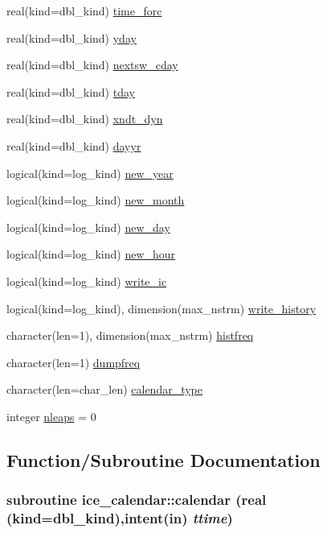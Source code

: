 \begin{DoxyCompactItemize}
real(kind=dbl\_\-kind) \hyperlink{namespaceice__calendar_abc4a1fb6d6f8356506f078c4265a6ce6}{time\_\-forc}
\item 
real(kind=dbl\_\-kind) \hyperlink{namespaceice__calendar_a4b4393c99a1d82bc45fcee5d7f6c1eab}{yday}
\item 
real(kind=dbl\_\-kind) \hyperlink{namespaceice__calendar_a04f5a8dadd1f3a10e3909afc246aebe4}{nextsw\_\-cday}
\item 
real(kind=dbl\_\-kind) \hyperlink{namespaceice__calendar_a7a56bc05233c72a7b5176c7c2d6abe7c}{tday}
\item 
real(kind=dbl\_\-kind) \hyperlink{namespaceice__calendar_aaf7ba66b2706feaef77263c10d65e28a}{xndt\_\-dyn}
\item 
real(kind=dbl\_\-kind) \hyperlink{namespaceice__calendar_a729d7e640fbfecac3733865efcfcb042}{dayyr}
\item 
logical(kind=log\_\-kind) \hyperlink{namespaceice__calendar_a2d0b7e0b5144d49dd2e39690c5cde21f}{new\_\-year}
\item 
logical(kind=log\_\-kind) \hyperlink{namespaceice__calendar_adf4af22505e09a7ed33b5c480cce75af}{new\_\-month}
\item 
logical(kind=log\_\-kind) \hyperlink{namespaceice__calendar_a766cb3e9a2b5b634a04a558bade2457c}{new\_\-day}
\item 
logical(kind=log\_\-kind) \hyperlink{namespaceice__calendar_a0c8bfc71143cc3c7aef340ad41a9068d}{new\_\-hour}
\item 
logical(kind=log\_\-kind) \hyperlink{namespaceice__calendar_a0ab845607bc7966960d11bffb6f9f069}{write\_\-ic}
\item 
logical(kind=log\_\-kind), dimension(max\_\-nstrm) \hyperlink{namespaceice__calendar_a610c4039b3869befd73705569c033bef}{write\_\-history}
\item 
character(len=1), dimension(max\_\-nstrm) \hyperlink{namespaceice__calendar_a0502fca3c549cbfb5113eddd7de76b20}{histfreq}
\item 
character(len=1) \hyperlink{namespaceice__calendar_aa26268d5abce218fad113a08bedcf8d9}{dumpfreq}
\item 
character(len=char\_\-len) \hyperlink{namespaceice__calendar_ad01a9ecbaab3997c0252754dee9aa0c7}{calendar\_\-type}
\item 
integer \hyperlink{namespaceice__calendar_a671fa04415abb84aa5564c9269f47f81}{nleaps} = 0
\end{DoxyCompactItemize}


\subsection{Function/Subroutine Documentation}
\hypertarget{namespaceice__calendar_aa88caa12cfe780c61ddec5bfc825e93c}{
\subsubsection[{calendar}]{\setlength{\rightskip}{0pt plus 5cm}subroutine ice\_\-calendar::calendar (real (kind=dbl\_\-kind),intent(in) {\em ttime})}}
\label{namespaceice__calendar_aa88caa12cfe780c61ddec5bfc825e93c}


